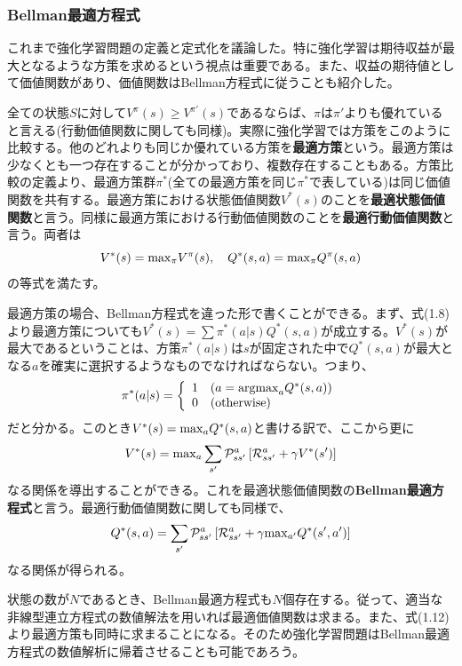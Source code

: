 \documentclass[dvipdfmx, 9pt, a4paper]{jsarticle}
\numberwithin{equation}{section}
\begin{document}
\subsubsection{Bellman最適方程式}
これまで強化学習問題の定義と定式化を議論した。特に強化学習は期待収益が最大となるような方策を求めるという視点は重要である。また、収益の期待値として価値関数があり、価値関数はBellman方程式に従うことも紹介した。\par
全ての状態$S$に対して$V^\pi(s) \geq V^{\pi'}(s)$であるならば、$\pi$は$\pi'$よりも優れていると言える(行動価値関数に関しても同様)。実際に強化学習では方策をこのように比較する。他のどれよりも同じか優れている方策を{\bf 最適方策}という。最適方策は少なくとも一つ存在することが分かっており、複数存在することもある。方策比較の定義より、最適方策群$\pi^*$(全ての最適方策を同じ$\pi^*$で表している)は同じ価値関数を共有する。最適方策における状態価値関数$V^*(s)$のことを{\bf 最適状態価値関数}と言う。同様に最適方策における行動価値関数のことを{\bf 最適行動価値関数}と言う。両者は
\begin{equation}
V^*(s)={\rm max}_\pi V^\pi(s),~~~Q^*(s, a)={\rm max}_\pi Q^\pi(s, a) \notag
\end{equation}
の等式を満たす。\par
最適方策の場合、Bellman方程式を違った形で書くことができる。まず、式(1.8)より最適方策についても$V^*(s)=\sum \pi^*(a|s)Q^*(s, a)$が成立する。$V^*(s)$が最大であるということは、方策$\pi^*(a|s)$は$s$が固定された中で$Q^*(s, a)$が最大となる$a$を確実に選択するようなものでなければならない。つまり、
\begin{equation}
\pi^*(a|s)=
\left\{
\begin{array}{ll}
1 & (a = {\rm argmax}_aQ^*(s, a)) \\
0 & ({\rm otherwise})
\end{array}\right.
\end{equation}
だと分かる。このとき$V^*(s)={\rm max}_aQ^*(s, a)$と書ける訳で、ここから更に
\begin{equation}
V^*(s)={\rm max}_a\sum_{s'}\mathcal{P}^a_{ss'}\left[ \mathcal{R}^a_{ss'}+\gamma V^*(s') \right]
\end{equation}
なる関係を導出することができる。これを最適状態価値関数の{\bf Bellman最適方程式}と言う。最適行動価値関数に関しても同様で、
\begin{equation}
Q^*(s, a)=\sum_{s'}\mathcal{P}^a_{ss'}\left[ \mathcal{R}^a_{ss'}+\gamma {\rm max}_{a'}Q^*(s', a') \right]
\end{equation}
なる関係が得られる。\par
状態の数が$N$であるとき、Bellman最適方程式も$N$個存在する。従って、適当な非線型連立方程式の数値解法を用いれば最適価値関数は求まる。また、式(1.12)より最適方策も同時に求まることになる。そのため強化学習問題はBellman最適方程式の数値解析に帰着させることも可能であろう。
\end{document}
